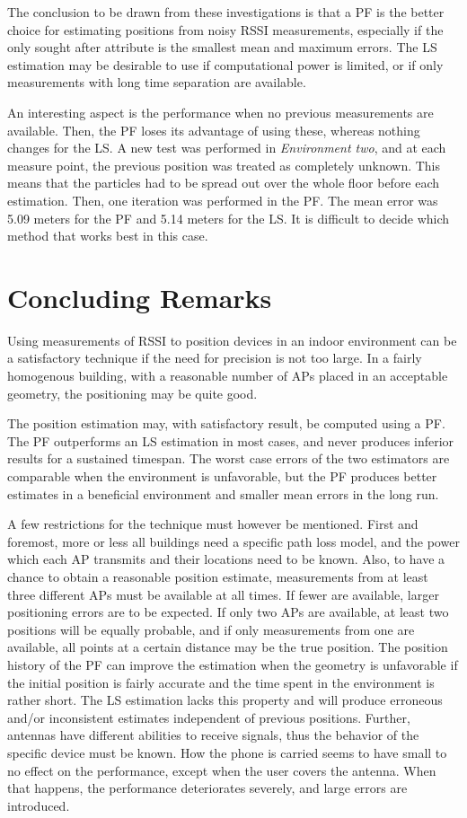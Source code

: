 \documentclass{LTHthesis}
\begin{document}
The conclusion to be drawn from these investigations is that a PF is the better choice for estimating positions from noisy RSSI measurements, especially if the only sought after attribute is the smallest mean and maximum errors. The LS estimation may be desirable to use if computational power is limited, or if only measurements with long time separation are available.

An interesting aspect is the performance when no previous measurements are available. Then, the PF loses its advantage of using these, whereas nothing changes for the LS. A new test was performed in \emph{Environment two}, and at each measure point, the previous position was treated as completely unknown. This means that the particles had to be spread out over the whole floor before each estimation. Then, one iteration was performed in the PF. The mean error was 5.09 meters for the PF and 5.14 meters for the LS. It is difficult to decide which method that works best in this case. 

%
\section{Concluding Remarks}
%
Using measurements of RSSI to position devices in an indoor environment can be a satisfactory technique if the need for precision is not too large. In a fairly homogenous building, with a reasonable number of APs placed in an acceptable geometry, the positioning may be quite good. 

The position estimation may, with satisfactory result, be computed using a PF. The PF outperforms an LS estimation in most cases, and never produces inferior results for a sustained timespan. The worst case errors of the two estimators are comparable when the environment is unfavorable, but the PF produces better estimates in a beneficial environment and smaller mean errors in the long run. 

A few restrictions for the technique must however be mentioned. First and foremost, more or less all buildings need a specific path loss model, and the power which each AP transmits and their locations need to be known. Also, to have a chance to obtain a reasonable position estimate, measurements from at least three different APs must be available at all times. If fewer are available, larger positioning errors are to be expected. If only two APs are available, at least two positions will be equally probable, and if only measurements from one are available, all points at a certain distance may be the true position. The position history of the PF can improve the estimation when the geometry is unfavorable if the initial position is fairly accurate and the time spent in the environment is rather short. The LS estimation lacks this property and will produce erroneous and/or inconsistent estimates independent of previous positions. Further, antennas have different abilities to receive signals, thus the behavior of the specific device must be known. How the phone is carried seems to have small to no effect on the performance, except when the user covers the antenna. When that happens, the performance deteriorates severely, and large errors are introduced.   
\end{document}
